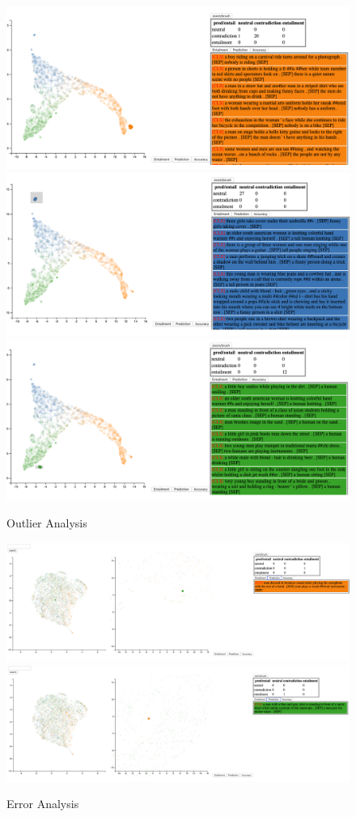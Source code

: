 \begin{figure}[h]

\centering
\includegraphics[width=.3\textwidth]{figs/fig8.png}\hfill
\includegraphics[width=.3\textwidth]{figs/fig9.png}\hfill
\includegraphics[width=.3\textwidth]{figs/fig10.png}

\caption{Outlier Analysis}
\label{fig:outliers}

\end{figure}

\begin{figure}[h]

\centering
\includegraphics[width=.4\textwidth]{figs/fig7.png}\hfill
\includegraphics[width=.4\textwidth]{figs/fig11.png}

\caption{Error Analysis}
\label{fig:false}

\end{figure}
